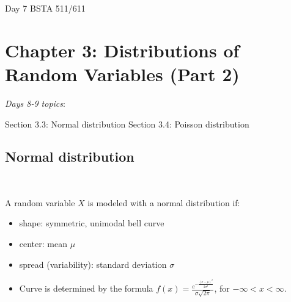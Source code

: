 \documentclass[12pt]{amsart}
\newtheorem{example}[theorem]{Example}
\newcommand{\m}{\mu}
\newcommand{\s}{\sigma}
\begin{document}
\setcounter{section}{3}
\setcounter{subsection}{1}
Day 7 BSTA 511/611
{\huge  
\section*{Chapter 3: Distributions of Random Variables (Part 2)}
}



{\large 

\emph{Days 8-9 topics}:

Section 3.3: Normal distribution  \newline
Section 3.4: Poisson distribution

\hrulefill

%
%
%
%
%
%








\subsection{Normal distribution} $\ $ \newline

A random variable $X$ is modeled with a normal distribution if:
\begin{itemize}
\item shape: symmetric, unimodal bell curve
\item center: mean $\m$
\item spread (variability): standard deviation $\s$
\item Curve is determined by the formula $f(x) = \frac{e^{-\frac{(x-\m)^2}{2\s^2}}}{\s\sqrt{2\pi}}$, for $-\infty < x< \infty$.


\end{itemize}}
\end{document}
